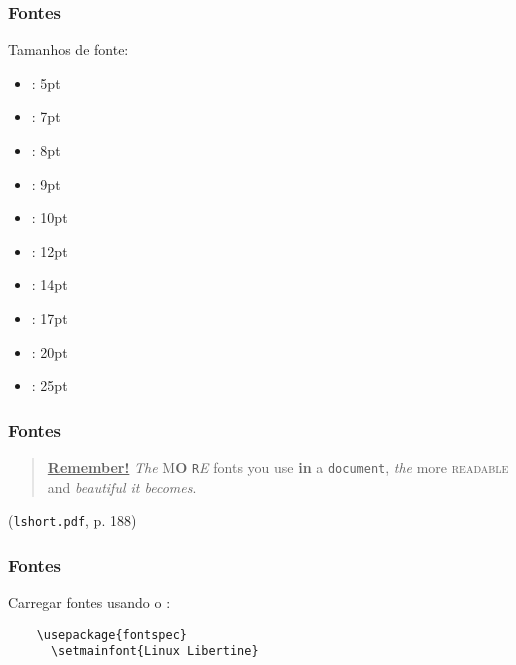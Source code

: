 \begin{frame}[fragile]
  \frametitle{Fontes}
  \large
  Tamanhos de fonte:
  \begin{multicols}{2}
    \begin{itemize}
      \item{: 5pt}
      \item{: 7pt}
      \item{: 8pt}
      \item{: 9pt}
      \item{: 10pt}
      \item{: 12pt}
      \item{: 14pt}
      \item{: 17pt}
      \item{: 20pt}
      \item{: 25pt}
    \end{itemize}
  \end{multicols}
\end{frame}

\begin{frame}
  \frametitle{Fontes}
  \begin{quote}
    \underline{\textbf{Remember\Huge!}} \textit{The}
    \textsf{M\textbf{\LARGE O} \texttt{R}\textsl{E}} fonts \Huge you
    \tiny use \footnotesize \textbf{in} a \small \texttt{document},
    \large \textit{the} \normalsize more \textsc{readable} and
    \textsl{\textsf{beautiful} it bec\large o\Large m\LARGE e\huge s}.
  \end{quote}
  \begin{flushright}
    (\texttt{lshort.pdf}, p. 188)
  \end{flushright}
\end{frame}

\begin{frame}[fragile]
  \frametitle{Fontes}
  \large
  Carregar fontes usando o :

  \begin{verbatim}
    \usepackage{fontspec}
      \setmainfont{Linux Libertine}
  \end{verbatim}
\end{frame}


